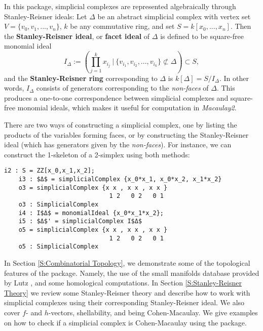 \documentclass[12pt,leqno]{amsart}
\theoremstyle{definition}
\newenvironment{example}
{\pushQED{\qed}\renewcommand{\qedsymbol}{$\diamond$}\examplex}
{\popQED\endexamplex}
\begin{document}
In this package, simplicial complexes are represented algebraically through Stanley-Reisner ideals: Let $\Delta$ be an abstract simplicial complex with vertex set $V = \{v_0,v_1,...,v_n\}$, $k$ be any commutative ring, and set $S = k[x_0,...,x_n]$. Then the \textbf{Stanley-Reisner ideal}, or \textbf{facet ideal} of $\Delta$ is defined to be square-free monomial ideal
%
\begin{displaymath}
  I_\Delta := \left( \prod_{j=1}^k x_{i_j} \ \bigg\vert \ \{ v_{i_1},v_{i_2},...,v_{i_k} \} \not \subset \Delta \right) \subset S,
\end{displaymath}
%
and the \textbf{Stanley-Reisner ring} corresponding to $\Delta$ is $k[\Delta] = S/I_\Delta$. In other words, $I_\Delta$ consists of generators corresponding to the \textit{non-faces} of $\Delta$. This produces a one-to-one correspondence between simplicial complexes and square-free monomial ideals, which makes it useful for computation in \textit{Macaulay2}.

\begin{example}\label{example of using database}
  There are two ways of constructing a simplicial complex, one by listing the products of the variables forming faces, or by constructing the Stanley-Reisner ideal (which has generators given by the \textit{non-faces}). For instance, we can construct the 1-skeleton of a 2-simplex using both methods:
  \begin{lstlisting}[basicstyle={\ttfamily \scriptsize}, xleftmargin=-23pt]
    i2 : S = ZZ[x_0,x_1,x_2];
    i3 : $Δ$ = simplicialComplex {x_0*x_1, x_0*x_2, x_1*x_2}
    o3 = simplicialComplex {x x , x x , x x }
                             1 2   0 2   0 1
    o3 : SimplicialComplex
    i4 : I$Δ$ = monomialIdeal {x_0*x_1*x_2};
    i5 : $Δ$' = simplicialComplex I$Δ$
    o5 = simplicialComplex {x x , x x , x x }
                             1 2   0 2   0 1
    o5 : SimplicialComplex
  \end{lstlisting}
\end{example}

In Section \ref{S:Combinatorial Topology}, we demonstrate some of the topological features of the package. Namely, the use of the small manifolds database provided by Lutz \cite{LutzM}, and some homological computations. In Section \ref{S:Stanley-Reisner Theory} we review some Stanley-Reisner theory and describe how to work with simplicial complexes using their corresponding Stanley-Reisner ideal. We also cover $f$- and $h$-vectors, shellability, and being Cohen-Macaulay. We give examples on how to check if a simplicial complex is Cohen-Macaulay using the package.
\end{document}
